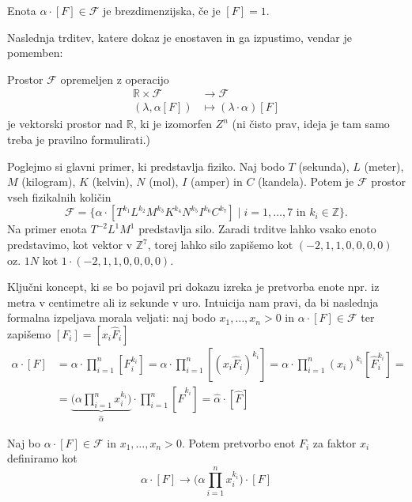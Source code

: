 \documentclass[mat2, tisk]{fmfdelo}
\newcommand{\R}{\mathbb R}
\newcommand{\Z}{\mathbb Z}
\begin{document}
\begin{definicija}
Enota $\alpha\cdot[F] \in \mathcal{F}$ je brezdimenzijska, če je $[F] = 1$.
\end{definicija}

Naslednja trditev, katere dokaz je enostaven in ga izpustimo, vendar je pomemben: 

\begin{trditev}
Prostor $\mathcal{F}$ opremeljen z operacijo 
\begin{align*}
\R \times \mathcal{F} &\rightarrow \mathcal{F} \\
(\lambda, \alpha[F]) &\mapsto (\lambda \cdot \alpha)[F]
\end{align*}
je vektorski prostor nad $\R$, ki je izomorfen $Z^n$ (ni čisto prav, ideja je tam samo treba je pravilno formulirati.)
\end{trditev}

\begin{primer}
 Poglejmo si glavni primer, ki predstavlja fiziko. Naj bodo 
 $T$ (sekunda), $L$ (meter), $M$ (kilogram), $K$ (kelvin), $N$ (mol), $I$ (amper) in $C$ (kandela).
 Potem je $\mathcal{F}$ prostor vseh fizikalnih količin
 $$
 \mathcal{F} = \{\alpha \cdot [T^{k_1} L^{k_2} M^{k_3} K^{k_4} N^{k_5} I^{k_6} C^{k_7}] \mid i = 1, \dots, 7 \text{ in } k_i \in \Z\}.
 $$
 Na primer enota $T^{-2}L^1M^1$ predstavlja silo. Zaradi trditve lahko 
 vsako enoto predstavimo, kot vektor v $\Z^7$, torej lahko silo zapišemo kot 
 $(-2, 1, 1, 0, 0, 0, 0)$ oz. $1N$ kot $1 \cdot (-2, 1, 1, 0, 0, 0, 0)$.
 \end{primer}

Ključni koncept, ki se bo pojavil pri dokazu izreka je pretvorba enote npr.
iz metra v centimetre ali iz sekunde v uro. Intuicija nam pravi, da 
bi naslednja formalna izpeljava morala veljati: naj bodo $x_1, \dots, x_n > 0$ in 
$\alpha\cdot[F]\in \mathcal{F}$ ter zapišemo $[F_i] = [x_i \hat{F}_i]$
\begin{align*}
\alpha \cdot [F] &= \alpha\cdot \prod_{i=1}^n [F_i^{k_i}] = 
\alpha\cdot \prod_{i=1}^n [(x_i\hat{F}_i)^{k_i}] = 
\alpha\cdot \prod_{i=1}^n (x_i)^{k_i} [\hat{F}_i^{k_i}] = \\
&= \underbrace{\Big(\alpha\prod_{i=1}^n x_i^{k_i}\Big)}_{\hat{\alpha}} \cdot \prod_{i=1}^n [\hat{F}^{k_i}] = \hat{\alpha}\cdot [\hat{F}]
\end{align*}

\begin{definicija}
Naj bo $\alpha\cdot [F] \in \mathcal{F}$ in $x_1, \dots, x_n > 0$. Potem 
pretvorbo enot $F_i$ za faktor $x_i$ definiramo kot 
\begin{equation}
 \alpha\cdot [F] \rightarrow \Big(\alpha\prod_{i=1}^n x_i^{k_i}\Big)\cdot [F]
\end{equation}
\end{definicija}
\end{document}
